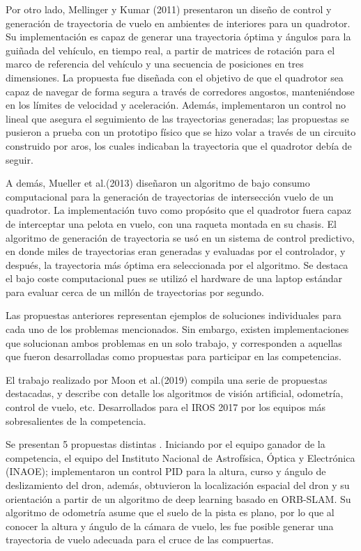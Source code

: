 Por otro lado, Mellinger y Kumar (2011)\cite{mellinger2011minimum} presentaron un diseño de control y generación de trayectoria de vuelo en ambientes de interiores para un quadrotor. Su implementación es capaz de generar una trayectoria óptima y ángulos para la guiñada del vehículo, en tiempo real, a partir de matrices de rotación para el marco de referencia del vehículo y una secuencia de posiciones en tres dimensiones. La propuesta fue diseñada con el objetivo de que el quadrotor sea capaz de navegar de forma segura a través de corredores angostos, manteniéndose en los límites de velocidad y aceleración. Además, implementaron un control no lineal que asegura el seguimiento de las trayectorias generadas; las propuestas se pusieron a prueba con un prototipo físico  que se hizo volar a través de un circuito construido por aros, los cuales indicaban la trayectoria que el quadrotor debía de seguir.

A demás, Mueller et al.(2013)\cite{mueller2013computationally} diseñaron un algoritmo de bajo consumo computacional para la generación de trayectorias de intersección vuelo de un quadrotor. La implementación tuvo como propósito que el quadrotor fuera capaz de interceptar una pelota en vuelo, con una raqueta montada en su chasis. El algoritmo de generación de trayectoria se usó en un sistema de control predictivo, en donde miles de trayectorias eran generadas y evaluadas por el controlador, y después, la trayectoria más óptima era seleccionada por el algoritmo.  Se destaca el bajo coste computacional pues se utilizó el hardware de una laptop estándar para evaluar cerca de un millón de trayectorias por segundo.

Las propuestas anteriores representan ejemplos de soluciones individuales para cada uno de los problemas mencionados. Sin embargo, existen implementaciones que solucionan ambos problemas en un solo trabajo, y corresponden a aquellas que fueron desarrolladas como propuestas para participar en las competencias.

El trabajo realizado por Moon et al.(2019) \cite{moon2019challenges} compila una serie de propuestas destacadas, y describe con detalle los algoritmos de visión artificial, odometría, control de vuelo, etc. Desarrollados para el IROS 2017 por los equipos más sobresalientes de la competencia. 

Se presentan 5 propuestas distintas \cite{moon2019challenges}. Iniciando por el equipo ganador de la competencia, el equipo del Instituto Nacional de Astrofísica, Óptica y Electrónica (INAOE); implementaron un control PID para la altura, curso y ángulo de deslizamiento del dron, además, obtuvieron la localización espacial del dron y su orientación a partir de un algoritmo de  deep learning basado en ORB-SLAM. Su algoritmo de odometría asume que el suelo de la pista es plano, por lo que al conocer la altura y ángulo de la cámara de vuelo, les fue posible generar una trayectoria de vuelo adecuada para el cruce de las compuertas. 


